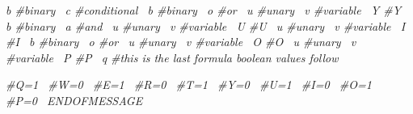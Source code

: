 {\itshape {\ttfamily  b \#binary~\newline
 c \#conditional~\newline
 b \#binary~\newline
 o \#or~\newline
 u \#unary~\newline
 v \#variable~\newline
 Y \#Y~\newline
 b \#binary~\newline
 a \#and~\newline
 u \#unary~\newline
 v \#variable~\newline
 U \#U~\newline
 u \#unary~\newline
 v \#variable~\newline
 I \#I~\newline
 b \#binary~\newline
 o \#or~\newline
 u \#unary~\newline
 v \#variable~\newline
 O \#O~\newline
 u \#unary~\newline
 v \#variable~\newline
 P \#P~\newline
 q \#this is the last formula boolean values follow~\newline
}}

{\itshape { \#Q=1~ \#W=0~ \#E=1~ \#R=0~ \#T=1~ \#Y=0~ \#U=1~ \#I=0~ \#O=1~ \#P=0~\newline
 E\+N\+D\+O\+F\+M\+E\+S\+S\+A\+GE~\newline
 } } 